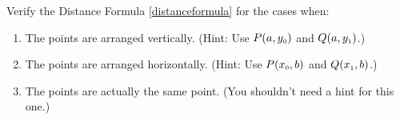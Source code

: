 {\label{distanceothercases} Verify the Distance Formula \ref{distanceformula} for the cases when:

\begin{enumerate}

\item The points are arranged vertically.  (Hint: Use $P(a, y_{\mbox{\tiny$0$}})$ and $Q(a, y_{\mbox{\tiny$1$}})$.)
\item The points are arranged horizontally. (Hint: Use $P(x_{\mbox{\tiny$0$}}, b)$ and $Q(x_{\mbox{\tiny$1$}}, b)$.)
\item The points are actually the same point. (You shouldn't need a hint for this one.)

\end{enumerate}}
{}